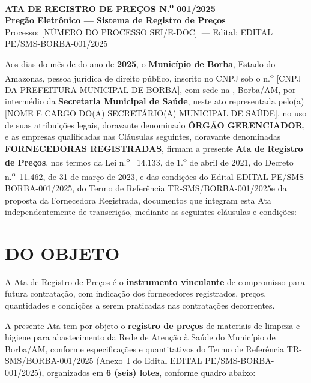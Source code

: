 \documentclass[12pt,a4paper]{article}
\newcommand{\art}[1]{art.\,#1}
\newcommand{\blank}[1]{\underline{\hspace{#1}}}
\newcommand{\arpNum}{001}          %
\newcommand{\exercicio}{2025}
\newcommand{\editalRef}{EDITAL PE/SMS-BORBA-001/2025}
\newcommand{\trRef}{TR-SMS/BORBA-001/2025}
\newcommand{\procNum}{[NÚMERO DO PROCESSO SEI/E-DOC]}
\newcommand{\munCNPJ}{[CNPJ DA PREFEITURA MUNICIPAL DE BORBA]}
\newcommand{\secretario}{[NOME E CARGO DO(A) SECRETÁRIO(A) MUNICIPAL DE SAÚDE]}
\begin{document}
\vspace{0.3cm}
\tableofcontents
\clearpage

\begin{center}
{\large\bfseries\color{navy}ATA DE REGISTRO DE PREÇOS N.\textsuperscript{o}
  \arpNum/\exercicio}\\[4pt]
{\normalsize\bfseries Pregão Eletrônico --- Sistema de Registro de Preços}\\
{\small Processo: \procNum\ --- Edital: \editalRef}
\end{center}

\bigskip
\noindent Aos \blank{0.8cm} dias do mês de \blank{2.5cm} do ano de
\textbf{\exercicio}, o \textbf{Município de Borba}, Estado do Amazonas, pessoa
jurídica de direito público, inscrito no CNPJ sob o n.\textsuperscript{o}
\munCNPJ, com sede na \blank{5cm}, Borba/AM, por intermédio da
\textbf{Secretaria Municipal de Saúde}, neste ato representada pelo(a)
\secretario, no uso de suas atribuições legais, doravante denominado
\textbf{ÓRGÃO GERENCIADOR}, e as empresas qualificadas nas Cláusulas seguintes,
doravante denominadas \textbf{FORNECEDORAS REGISTRADAS}, firmam a presente
\textbf{Ata de Registro de Preços}, nos termos da Lei n.\textsuperscript{o}~
14.133, de 1.\textsuperscript{o} de abril de 2021, do Decreto
n.\textsuperscript{o}~11.462, de 31 de março de 2023, e das condições do
Edital \editalRef, do Termo de Referência \trRef e da proposta da Fornecedora
Registrada, documentos que integram esta Ata independentemente de transcrição,
mediante as seguintes cláusulas e condições:

\section{DO OBJETO}

\begin{legalbox}[\art{82}, \textit{caput}, Lei n.\textsuperscript{o} 14.133/2021]
\small A Ata de Registro de Preços é o \textbf{instrumento vinculante} de
compromisso para futura contratação, com indicação dos fornecedores registrados,
preços, quantidades e condições a serem praticadas nas contratações decorrentes.
\end{legalbox}

\noindent A presente Ata tem por objeto o \textbf{registro de preços} de materiais
de limpeza e higiene para abastecimento da Rede de Atenção à Saúde do Município de
Borba/AM, conforme especificações e quantitativos do Termo de Referência \trRef
(Anexo~I do Edital \editalRef), organizados em \textbf{6 (seis) lotes}, conforme
quadro abaixo:
\end{document}
